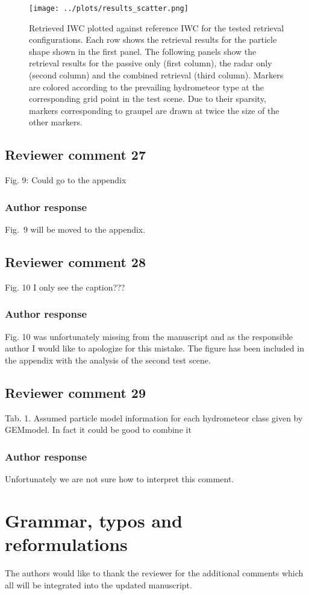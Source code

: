 \documentclass[11pt]{scrartcl}
\begin{document}
\begin{figure}
\centering \texttt{[image: ../plots/results\_scatter.png]}
\caption{Retrieved IWC plotted against reference IWC for the tested retrieval
  configurations. Each row shows the retrieval results for the particle shape
  shown in the first panel. The following panels show the retrieval results for
  the passive only (first column), the radar only (second column) and the
  combined retrieval (third column). Markers are colored according to the
  prevailing hydrometeor type at the corresponding grid point in the test
  scene. Due to their sparsity, markers corresponding to graupel are drawn at
  twice the size of the other markers.}
\label{fig:results_scatter_a_1}
\end{figure}

\subsection*{Reviewer comment 27}
Fig. 9: Could go to the appendix

\subsubsection*{Author response}
Fig.~9 will be moved to the appendix.

\subsection*{Reviewer comment 28}
Fig. 10 I only see the caption???

\subsubsection*{Author response}
Fig. 10 was unfortunately missing from the manuscript and as the responsible author I would like
to apologize for this mistake. The figure has been included in the appendix with the analysis
of the second test scene.

\subsection*{Reviewer comment 29}
Tab. 1. Assumed particle model information for each hydrometeor class given by GEMmodel. In fact it could be good to combine it

\subsubsection*{Author response}
Unfortunately we are not sure how to interpret this comment.

\section*{Grammar, typos and reformulations}

The authors would like to thank the reviewer for the additional comments which all
will be integrated into the updated manuscript.
\end{document}

